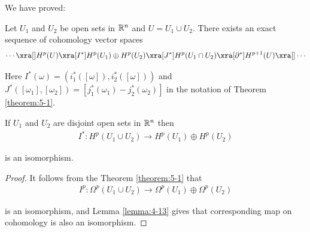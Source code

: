 We have proved:

\begin{theorem}\label{theorem:5-2}
Let $U_1$ and $U_2$ be open sets in ${\mathbb{R}}^n$ and $U = U_1\cup U_2$.
There exists an exact sequence of cohomology vector spaces
\begin{align*}
  \cdots\xra[]H^p(U)\xra[I^*]H^p(U_1)\oplus H^p(U_2)\xra[J^*]H^p(U_1\cap U_2)\xra[\partial^*]H^{p+1}(U)\xra[]\cdots
\end{align*}

Here $I^*(\omega) = (i^*_1([\omega]), i^*_2([\omega]))$ and $J^*([\omega_1], [\omega_2]) = [j^*_1(\omega_1) - j^*_2(\omega_2)]$
in the notation of Theorem \ref{theorem:5-1}.
\end{theorem}

\begin{corollary}\label{corollary:5-3}
  If $U_1$ and $U_2$ are disjoint open sets in ${\mathbb{R}}^n$ then
  \begin{align*}
    I^*:H^p(U_1\cup U_2)\to H^p(U_1)\oplus H^p(U_2)
  \end{align*}

  is an isomorphism.
\end{corollary}

\begin{proof}
  It follows from the Theorem \ref{theorem:5-1} that 
  \begin{align*}
    I^p:\Omega^p(U_1\cup U_2)\to\Omega^p(U_1)\oplus\Omega^p(U_2)
  \end{align*}

  is an isomorphism, and Lemma \ref{lemma:4-13} gives that corresponding map on cohomology is also an isomorphism.
\end{proof}

